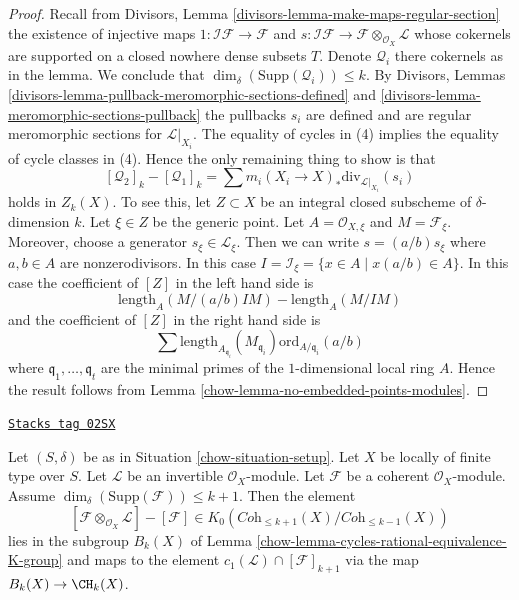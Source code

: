\begin{proof}

Recall from Divisors, Lemma \ref{divisors-lemma-make-maps-regular-section}
the existence of injective maps
$1 : \mathcal{I}\mathcal{F} \to \mathcal{F}$ and
$s : \mathcal{I}\mathcal{F} \to \mathcal{F} \otimes_{\mathcal{O}_X}\mathcal{L}$
whose cokernels are supported on a closed nowhere dense subsets $T$.
Denote $\mathcal{Q}_i$ there cokernels as in the lemma.
We conclude that $\dim_\delta(\text{Supp}(\mathcal{Q}_i)) \leq k$.
By Divisors, Lemmas \ref{divisors-lemma-pullback-meromorphic-sections-defined}
and \ref{divisors-lemma-meromorphic-sections-pullback} the pullbacks $s_i$
are defined and are regular meromorphic sections for $\mathcal{L}|_{X_i}$.
The equality of cycles in (4) implies the equality of cycle classes
in (4). Hence the only remaining thing to show is that
$$
[\mathcal{Q}_2]_k - [\mathcal{Q}_1]_k
=
\sum m_i(X_i \to X)_*\text{div}_{\mathcal{L}|_{X_i}}(s_i)
$$
holds in $Z_k(X)$. To see this, let $Z \subset X$ be an integral closed
subscheme of $\delta$-dimension $k$. Let $\xi \in Z$ be the generic point.
Let $A = \mathcal{O}_{X, \xi}$ and $M = \mathcal{F}_\xi$.
Moreover, choose a generator $s_\xi \in \mathcal{L}_\xi$.
Then we can write $s = (a/b) s_\xi$ where $a, b \in A$ are
nonzerodivisors. In this case
$I = \mathcal{I}_\xi = \{x \in A \mid x(a/b) \in A\}$.
In this case the coefficient of $[Z]$ in the left hand side is
$$
\text{length}_A(M/(a/b)IM) - \text{length}_A(M/IM)
$$
and the coefficient of $[Z]$ in the right hand side
is
$$
\sum
\text{length}_{A_{\mathfrak q_i}}(M_{\mathfrak q_i})
\text{ord}_{A/\mathfrak q_i}(a/b)
$$
where $\mathfrak q_1, \ldots, \mathfrak q_t$ are the minimal
primes of the $1$-dimensional local ring $A$. Hence the result
follows from Lemma \ref{chow-lemma-no-embedded-points-modules}.
\end{proof}

\begin{lemma}
\label{chow-lemma-coherent-sheaf-cap-c1}
\href{https://stacks.math.columbia.edu/tag/02SX}{\texttt{Stacks tag 02SX}}

Let $(S, \delta)$ be as in Situation \ref{chow-situation-setup}.
Let $X$ be locally of finite type over $S$.
Let $\mathcal{L}$ be an invertible $\mathcal{O}_X$-module.
Let $\mathcal{F}$ be a coherent $\mathcal{O}_X$-module.
Assume $\dim_\delta(\text{Supp}(\mathcal{F})) \leq k + 1$.
Then the element
$$
[\mathcal{F} \otimes_{\mathcal{O}_X} \mathcal{L}]
-
[\mathcal{F}]
\in
K_0(\textit{Coh}_{\leq k + 1}(X)/\textit{Coh}_{\leq k - 1}(X))
$$
lies in the subgroup $B_k(X)$ of
Lemma \ref{chow-lemma-cycles-rational-equivalence-K-group} and maps to
the element $c_1(\mathcal{L}) \cap [\mathcal{F}]_{k + 1}$ via
the map $B_k(X) \to \CH_k(X)$.
\end{lemma}

